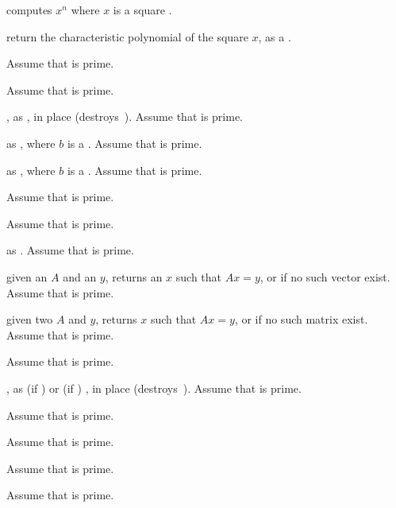  computes $x^n$ where $x$ is a
square .

 return the characteristic polynomial of
the square  $x$, as a .

 Assume that  is prime.

 Assume that  is prime.

, as , in place
(destroys~). Assume that  is prime.


 as , where $b$ is a
. Assume that  is prime.

 as , where $b$ is
a . Assume that  is prime.

 Assume that  is prime.

 Assume that  is prime.

 as . Assume that
 is prime.

 given an 
$A$ and an  $y$, returns an $x$ such that $Ax = y$, or 
if no such vector exist. Assume that  is prime.

given two  $A$ and $y$, returns $x$ such that $Ax = y$, or 
if no such matrix exist. Assume that  is prime.

 Assume that  is prime.

, as  (if
) or  (if ) , in place
(destroys~). Assume that  is prime.

 Assume that  is prime.

 Assume that  is prime.

 Assume that  is prime.

 Assume that  is prime.

